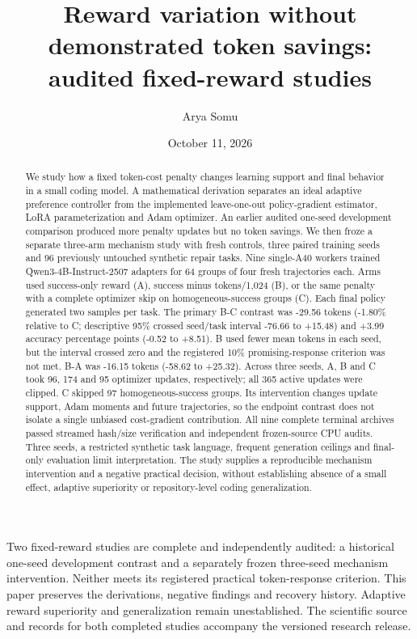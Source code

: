 \documentclass[11pt]{article}
\title{Reward variation without demonstrated token savings:\\audited fixed-reward studies}
\author{Arya Somu}
\date{October 11, 2026}
\begin{document}
\maketitle

Two fixed-reward studies are complete and independently audited: a historical one-seed development contrast and a separately frozen three-seed mechanism intervention. Neither meets its registered practical token-response criterion. This paper preserves the derivations, negative findings and recovery history. Adaptive reward superiority and generalization remain unestablished. The scientific source and records for both completed studies accompany the versioned research release.

\begin{abstract}

We study how a fixed token-cost penalty changes learning support and final behavior in a small coding model. A mathematical derivation separates an ideal adaptive preference controller from the implemented leave-one-out policy-gradient estimator, LoRA parameterization and Adam optimizer. An earlier audited one-seed development comparison produced more penalty updates but no token savings. We then froze a separate three-arm mechanism study with fresh controls, three paired training seeds and 96 previously untouched synthetic repair tasks. Nine single-A40 workers trained Qwen3-4B-Instruct-2507 adapters for 64 groups of four fresh trajectories each. Arms used success-only reward (A), success minus tokens/1,024 (B), or the same penalty with a complete optimizer skip on homogeneous-success groups (C). Each final policy generated two samples per task. The primary B-C contrast was -29.56 tokens (-1.80\% relative to C; descriptive 95\% crossed seed/task interval -76.66 to +15.48) and +3.99 accuracy percentage points (-0.52 to +8.51). B used fewer mean tokens in each seed, but the interval crossed zero and the registered 10\% promising-response criterion was not met. B-A was -16.15 tokens (-58.62 to +25.32). Across three seeds, A, B and C took 96, 174 and 95 optimizer updates, respectively; all 365 active updates were clipped. C skipped 97 homogeneous-success groups. Its intervention changes update support, Adam moments and future trajectories, so the endpoint contrast does not isolate a single unbiased cost-gradient contribution. All nine complete terminal archives passed streamed hash/size verification and independent frozen-source CPU audits. Three seeds, a restricted synthetic task language, frequent generation ceilings and final-only evaluation limit interpretation. The study supplies a reproducible mechanism intervention and a negative practical decision, without establishing absence of a small effect, adaptive superiority or repository-level coding generalization.

\end{abstract}
\end{document}

